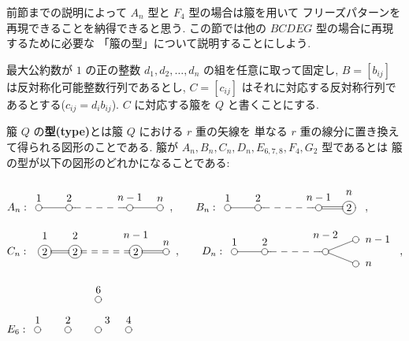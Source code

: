 \documentclass[12pt,twoside,dvipdfm]{jarticle}
\theoremstyle{definition} %
\theoremstyle{definition} %
\theoremstyle{definition} %
\numberwithin{theorem}{section}
\numberwithin{equation}{section}
\numberwithin{figure}{section}
\numberwithin{table}{section}
\begin{document}
前節までの説明によって $A_n$ 型と $F_4$ 型の場合は箙を用いて
フリーズパターンを再現できることを納得できると思う.
この節では他の $BCDEG$ 型の場合に再現するために必要な
「箙の型」について説明することにしよう.

最大公約数が $1$ の正の整数 $d_1,d_2,\ldots,d_n$ の組を任意に取って固定し, 
$B=[b_{ij}]$ は反対称化可能整数行列であるとし, 
$C=[c_{ij}]$ はそれに対応する反対称行列であるとする($c_{ij}=d_i b_{ij}$).
$C$ に対応する箙を $Q$ と書くことにする.

箙 $Q$ の{\bf 型(type)}とは箙 $Q$ における $r$ 重の矢線を
単なる $r$ 重の線分に置き換えて得られる図形のことである.
箙が $A_n,B_n,C_n,D_n,E_{6,7,8},F_4,G_2$ 型であるとは
箙の型が以下の図形のどれかになることである:
\begin{align*}
& A_n:
\begin{xy}
 ( 0,0)*+[Fo]{}="1"*++!D{1},
 (10,0)*+[Fo]{}="2"*++!D{2},
 (12,0)="a",
 (28,0)="b",
 (30,0)*+[Fo]{}="m"*++!D{n-1},
 (40,0)*+[Fo]{}="n"*++!D{n},
 \ar@{-}"1";"2",
 \ar@{-}"2";"a",
 \ar@{--}"a";"b",
 \ar@{-}"b";"m",
 \ar@{-}"m";"n"
\end{xy},
\qquad
B_n:
\begin{xy}
 ( 0,0)*+[Fo]{}="1"*++!D{1},
 (10,0)*+[Fo]{}="2"*++!D{2},
 (12,0)="a",
 (28,0)="b",
 (30,0)*+[Fo]{}="m"*++!D{n-1},
 (40,0)*+[Fo]{2}="n"*++++!D{n},
 \ar@{-}"1";"2",
 \ar@{-}"2";"a",
 \ar@{--}"a";"b",
 \ar@{-}"b";"m",
 \ar@2{-}"m";"n"
\end{xy},
\\ &
C_n:
\begin{xy}
 ( 0,0)*+[Fo]{2}="1"*++++!D{1},
 (10,0)*+[Fo]{2}="2"*++++!D{2},
 (12,0)="a",
 (28,0)="b",
 (30,0)*+[Fo]{2}="m"*++++!D{n-1},
 (40,0)*+[Fo]{}="n"*++!D{n},
 \ar@2{-}"1";"2",
 \ar@2{-}"2";"a",
 \ar@2{--}"a";"b",
 \ar@2{-}"b";"m",
 \ar@2{-}"m";"n"
\end{xy},
\qquad
D_n:
\begin{xy}
 ( 0,0)*+[Fo]{}="1"*++!D{1},
 (10,0)*+[Fo]{}="2"*++!D{2},
 (12,0)="a",
 (28,0)="b",
 (30,0)*+[Fo]{}="l"*++++!D{n-2},
 (40, 4)*+[Fo]{}="m"*+++!L{n-1},
 (40,-4)*+[Fo]{}="n"*+++!L{n},
 \ar@{-}"1";"2",
 \ar@{-}"2";"a",
 \ar@{--}"a";"b",
 \ar@{-}"b";"l",
 \ar@{-}"l";"m",
 \ar@{-}"l";"n"
\end{xy},
\\ &
E_6:
\begin{xy}
 ( 0, 0)*+[Fo]{}="1"*++!D{1},
 (10, 0)*+[Fo]{}="2"*++!D{2},
 (20, 0)*+[Fo]{}="3"*++!DL{3},
 (20,10)*+[Fo]{}="6"*++!D{6},
 (30, 0)*+[Fo]{}="4"*++!D{4},

\end{xy}
\end{align*}
\end{document}

